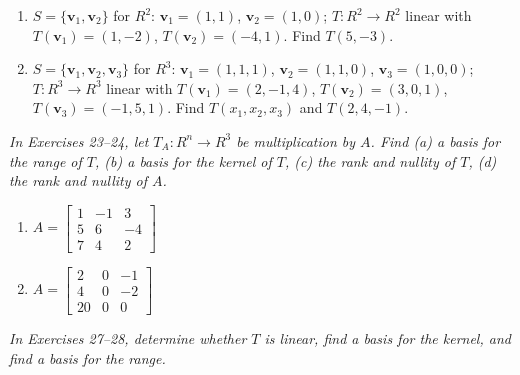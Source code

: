 \documentclass{article}
\begin{document}
\begin{enumerate}
  \item[19.] $S = \{\mathbf{v}_1,\mathbf{v}_2\}$ for $R^2$: $\mathbf{v}_1=(1,1)$,
        $\mathbf{v}_2=(1,0)$; $T : R^2 \to R^2$ linear with
        $T(\mathbf{v}_1)=(1,-2)$, $T(\mathbf{v}_2)=(-4,1)$. Find $T(5,-3)$.

  \item[21.] $S=\{\mathbf{v}_1,\mathbf{v}_2,\mathbf{v}_3\}$ for $R^3$:
        $\mathbf{v}_1=(1,1,1)$, $\mathbf{v}_2=(1,1,0)$, $\mathbf{v}_3=(1,0,0)$;
        $T : R^3 \to R^3$ linear with $T(\mathbf{v}_1)=(2,-1,4)$,
        $T(\mathbf{v}_2)=(3,0,1)$, $T(\mathbf{v}_3)=(-1,5,1)$.
        Find $T(x_1,x_2,x_3)$ and $T(2,4,-1)$.

\end{enumerate}

\noindent\textit{In Exercises 23--24, let $T_A : R^n \to R^3$ be multiplication by $A$.
Find (a) a basis for the range of $T$, (b) a basis for the kernel of $T$,
(c) the rank and nullity of $T$, (d) the rank and nullity of $A$.}

\begin{enumerate}
  \item[23.] $A = \begin{bmatrix}1&-1&3\\5&6&-4\\7&4&2\end{bmatrix}$

  \item[24.] $A = \begin{bmatrix}2&0&-1\\4&0&-2\\20&0&0\end{bmatrix}$

\end{enumerate}

\noindent\textit{In Exercises 27--28, determine whether $T$ is linear, find a basis for
the kernel, and find a basis for the range.}
\end{document}
